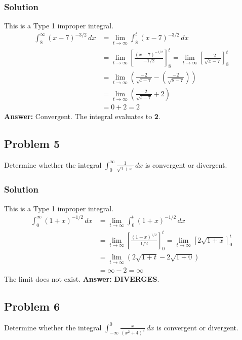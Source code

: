 \documentclass{article}
\begin{document}
\subsubsection*{Solution}
This is a Type 1 improper integral.
\begin{align*}
    \int_{8}^{\infty} (x-7)^{-3/2} \,dx &= \lim_{t \to \infty} \int_{8}^{t} (x-7)^{-3/2} \,dx \\
    &= \lim_{t \to \infty} \left[ \frac{(x-7)^{-1/2}}{-1/2} \right]_{8}^{t} = \lim_{t \to \infty} \left[ \frac{-2}{\sqrt{x-7}} \right]_{8}^{t} \\
    &= \lim_{t \to \infty} \left( \frac{-2}{\sqrt{t-7}} - \left(\frac{-2}{\sqrt{8-7}}\right) \right) \\
    &= \lim_{t \to \infty} \left( \frac{-2}{\sqrt{t-7}} + 2 \right) \\
    &= 0 + 2 = 2
\end{align*}
\textbf{Answer:} Convergent. The integral evaluates to \textbf{2}.

\subsection{Problem 5}
Determine whether the integral $ \int_{0}^{\infty} \frac{1}{\sqrt{1+x}} \,dx $ is convergent or divergent.
\subsubsection*{Solution}
This is a Type 1 improper integral.
\begin{align*}
    \int_{0}^{\infty} (1+x)^{-1/2} \,dx &= \lim_{t \to \infty} \int_{0}^{t} (1+x)^{-1/2} \,dx \\
    &= \lim_{t \to \infty} \left[ \frac{(1+x)^{1/2}}{1/2} \right]_{0}^{t} = \lim_{t \to \infty} \left[ 2\sqrt{1+x} \right]_{0}^{t} \\
    &= \lim_{t \to \infty} \left( 2\sqrt{1+t} - 2\sqrt{1+0} \right) \\
    &= \infty - 2 = \infty
\end{align*}
The limit does not exist.
\textbf{Answer:} \textbf{DIVERGES}.

\subsection{Problem 6}
Determine whether the integral $ \int_{-\infty}^{0} \frac{x}{(x^2+4)^2} \,dx $ is convergent or divergent.
\end{document}
